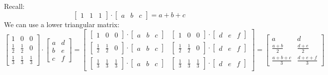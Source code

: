 \documentclass{article}
\begin{document}
Recall:
\[
    \begin{bmatrix}
        1 & 1 & 1
    \end{bmatrix}\cdot 
    \begin{bmatrix}
        a & b & c
    \end{bmatrix} = a + b + c
\]
We can use a lower triangular matrix:
\[
    \begin{bmatrix}
        1 & 0 & 0 \\[1mm] \frac{1}{2} & \frac{1}{2} & 0 \\[1mm] \frac{1}{3} & \frac{1}{3} & \frac{1}{3}
    \end{bmatrix}\cdot 
    \begin{bmatrix}
        a & d \\ b & e \\ c & f
    \end{bmatrix} = \begin{bmatrix}
        \begin{bmatrix}
            1 & 0 & 0
        \end{bmatrix}\cdot 
        \begin{bmatrix}
            a & b & c
        \end{bmatrix} & 
        \begin{bmatrix}
            1 & 0 & 0
        \end{bmatrix}\cdot 
        \begin{bmatrix}
            d & e & f
        \end{bmatrix} \\[1mm]  
        \begin{bmatrix}
            \frac{1}{2} & \frac{1}{2} & 0
        \end{bmatrix}\cdot 
        \begin{bmatrix}
            a & b & c
        \end{bmatrix} & 
        \begin{bmatrix}
            \frac{1}{2} & \frac{1}{2} & 0
        \end{bmatrix}\cdot 
        \begin{bmatrix}
            d & e & f
        \end{bmatrix} \\[1mm] 
        \begin{bmatrix}
            \frac{1}{3} & \frac{1}{3} & \frac{1}{3}
        \end{bmatrix}\cdot 
        \begin{bmatrix}
            a & b & c
        \end{bmatrix} & 
        \begin{bmatrix}
            \frac{1}{3} & \frac{1}{3} & \frac{1}{3}
        \end{bmatrix}\cdot 
        \begin{bmatrix}
            d & e & f
        \end{bmatrix}  
    \end{bmatrix} = 
    \begin{bmatrix}
        a & d \\[1mm] \frac{a+b}{2} & \frac{d+e}{2} \\[1mm] \frac{a+b+c}{3} & \frac{d+e+f}{3}
    \end{bmatrix}
\]
\end{document}
